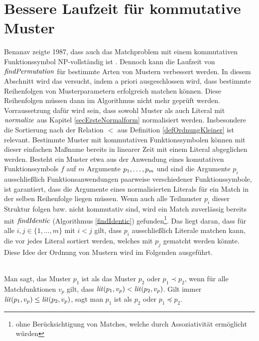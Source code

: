 \section{Bessere Laufzeit für kommutative Muster} \label{subsecCMuster}

Benanav zeigte 1987, dass auch das Matchproblem mit einem kommutativen Funktionssymbol NP-vollständig ist \cite{NPHardMatching}. Dennoch kann die Laufzeit von $\mathit{findPermutation}$ für bestimmte Arten von Mustern verbessert werden. In diesem Abschnitt wird das versucht, indem a priori ausgeschlossen wird, dass bestimmte Reihenfolgen von Musterparametern erfolgreich matchen können. Diese Reihenfolgen müssen dann im Algorithmus nicht mehr geprüft werden.
Vorraussetzung dafür wird sein, dass sowohl Muster als auch Literal mit $\mathit{normalize}$ aus Kapitel \ref{secErsteNormalform} normalisiert werden. Insbesondere die Sortierung nach der Relation $<$ aus Definition \ref{defOrdnungKleiner} ist relevant.
Bestimmte Muster mit kommutativen Funktionssymbolen können mit dieser einfachen Maßname bereits in linearer Zeit mit einem Literal abgeglichen werden. Besteht ein Muster etwa aus der Anwendung eines komutativen Funktionssymbols $f$ auf $m$ Argumente ${p}_{1}, \dots, {p}_{m}$ und sind die Argumente $p_i$ ausschließlich Funktionsanwendungen paarweise verschiedener Funktionssymbole, ist garantiert, dass die Argumente eines normalisierten Literals für ein Match in der selben Reihenfolge liegen müssen. Wenn auch alle Teilmuster $p_i$ dieser Struktur folgen bzw. nicht kommutativ sind, wird ein Match zuverlässig bereits mit $\mathit{findIdentic}$ (Algorithmus \ref{findIdentic}) gefunden\footnote{ohne Berücksichtigung von Matches, welche durch Assoziativität ermöglicht würden}. Das liegt daran, dass für alle $i, j \in \{1, \dots, m\}$ mit $ i < j$ gilt, dass $p_i$ ausschließlich Literale matchen kann, die vor jedes Literal sortiert werden, welches mit $p_j$ gematcht werden könnte. Diese Idee der Ordnung von Mustern wird im Folgenden ausgeführt.


\begin{definition}~\\
Man sagt, das Muster $p_1$ ist  als das Muster $p_2$ oder $p_1 \prec p_2$, wenn für alle Matchfunktionen $v_p$ gilt, dass $\mathit{lit}(p_1, v_p) < \mathit{lit}(p_2, v_p)$. Gilt immer $\mathit{lit}(p_1, v_p) \leq \mathit{lit}(p_2, v_p)$, sagt man $p_1$ ist  als $p_2$ oder $p_1 \preceq p_2$.
\end{definition}

